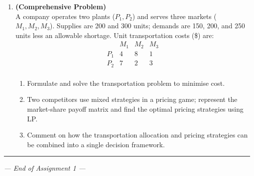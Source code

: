 \documentclass[12pt,a4paper]{article}
\begin{document}
\begin{enumerate}[leftmargin=*, label=\textbf{Q.\arabic*.}]
\item \textbf{(Comprehensive Problem)}\\
  A company operates two plants ($P_1, P_2$) and serves three markets
  ($M_1, M_2, M_3$).  Supplies are 200 and 300 units; demands are 150, 200,
  and 250 units less an allowable shortage.  Unit transportation costs (\$) are:
  \[
    \begin{array}{c|ccc}
      & M_1 & M_2 & M_3\\\hline
      P_1 & 4 & 8 & 1 \\
      P_2 & 7 & 2 & 3 \\
    \end{array}
  \]
  \begin{enumerate}[label=(\alph*)]
    \item Formulate and solve the transportation problem to minimise cost.
    \item Two competitors use mixed strategies in a pricing game; represent the
          market-share payoff matrix and find the optimal pricing strategies
          using LP.
    \item Comment on how the transportation allocation and pricing strategies
          can be combined into a single decision framework.
  \end{enumerate}

\end{enumerate}

\medskip\hrule\medskip
\begin{center}
  \textit{--- End of Assignment 1 ---}
\end{center}
\end{document}
